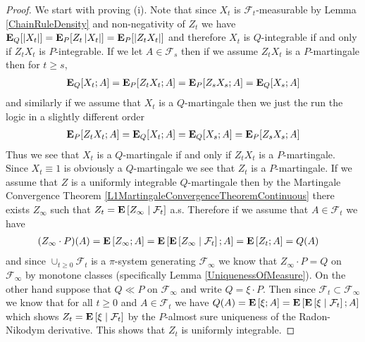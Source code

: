 \begin{proof}
We start with proving (i).  Note that since $X_t$ is $\mathcal{F}_t$-measurable by Lemma \ref{ChainRuleDensity} and non-negativity of $Z_t$ we have $\sexpectation{\abs{X_t}}{Q} = \sexpectation{Z_t \abs{X_t}}{P}= \sexpectation{ \abs{Z_t X_t}}{P}$ and therefore $X_t$ is $Q$-integrable if and only if $Z_t X_t$ is $P$-integrable.  If we let $A \in \mathcal{F}_s$ then if we assume $Z_t X_t$ is a $P$-martingale then for $t \geq s$,
\begin{align*}
\sexpectation{X_t ; A}{Q} = \sexpectation{Z_t X_t ; A}{P} = \sexpectation{Z_s X_s ; A}{P}  = \sexpectation{X_s ; A}{Q}
\end{align*}
and similarly if we assume that $X_t$ is a $Q$-martingale then we just the run the logic in a slightly different order
\begin{align*}
\sexpectation{Z_t X_t ; A}{P} = \sexpectation{X_t ; A}{Q} = \sexpectation{X_s ; A}{Q}  = \sexpectation{Z_s X_s ; A}{P}
\end{align*}
Thus we see that $X_t$ is a $Q$-martingale if and only if $Z_t X_t$ is a $P$-martingale.  Since $X_t \equiv 1$ is obviously a $Q$-martingale we see that $Z_t$ is a $P$-martingale.  If we assume that $Z$ is a uniformly integrable $Q$-martingale then by the Martingale Convergence Theorem \ref{L1MartingaleConvergenceTheoremContinuous} there exists $Z_\infty$ such that $Z_t = \cexpectationlong{\mathcal{F}_t}{Z_\infty}$ a.s.  Therefore if we assume that $A \in \mathcal{F}_t$ we have 
\begin{align*}
(Z_\infty \cdot P)(A) &= \expectation{Z_\infty ; A} = \expectation{\cexpectationlong{\mathcal{F}_t}{Z_\infty} ; A} = \expectation{Z_t; A} = Q(A)
\end{align*}
and since $\cup_{t \geq 0} \mathcal{F}_t$ is a $\pi$-system generating $\mathcal{F}_\infty$ we know that $Z_\infty \cdot P = Q$ on $\mathcal{F}_\infty$ by monotone classes (specifically Lemma \ref{UniquenessOfMeasure}).  On the other hand suppose that $Q \ll P$ on $\mathcal{F}_\infty$ and write $Q = \xi \cdot P$.  Then since $\mathcal{F}_t \subset \mathcal{F}_\infty$ we know that for all $t \geq 0$ and $A \in \mathcal{F}_t$ we have $Q(A) = \expectation{\xi ; A} = \expectation{\cexpectationlong{\mathcal{F}_t}{\xi} ; A}$ which shows $Z_t = \cexpectationlong{\mathcal{F}_t}{\xi}$ by the $P$-almost sure uniqueness of the Radon-Nikodym derivative.  This shows that $Z_t$ is uniformly integrable.


\end{proof}
